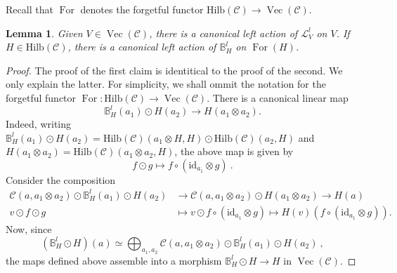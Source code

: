 \documentclass[a4paper,11pt,reqno]{amsart}
\numberwithin{equation}{section}
\newtheorem{lemma}[theorem]{Lemma}
\theoremstyle{remark}
\theoremstyle{definition}
\newcommand{\bB}{\mathbb B}
\newcommand{\cC}{\mathcal C}
\newcommand{\cL}{\mathcal L}
\DeclareMathOperator{\Vect}{Vec}
\DeclareMathOperator{\For}{For}
\newcommand{\id}{\mathrm{id}}
\newcommand{\Hilb}{\mathrm{Hilb}}
\begin{document}
Recall that $\For$ denotes the forgetful functor $\Hilb(\cC) \to \Vect(\cC)$.

\begin{lemma}
    Given $V \in \Vect(\cC)$, there is a canonical left action of $\cL_V^l$ on $V$. If $H \in \Hilb(\cC)$, there is a canonical left action of $\bB^l_H$ on $\For(H)$.
    \label{lemma:canonicalactionrightboundedoperators}
\end{lemma}
\begin{proof}
The proof of the first claim is identitical to the proof of the second. We only explain the latter. For simplicity, we shall ommit the notation for the forgetful functor $\For: \Hilb(\cC) \to \Vect(\cC)$. There is a canonical linear map
\[ \bB^l_H(a_1) \odot H(a_2) \to H(a_1 \otimes a_2) . \]
Indeed, writing $\bB^l_H(a_1) \odot H(a_2) = \Hilb(\cC)(a_1 \otimes H,H) \odot \Hilb(\cC)(a_2,H)$ and $H(a_1 \otimes a_2) = \Hilb(\cC)(a_1 \otimes a_2, H)$, the above map is given by
    \[ f \odot g \mapsto f \circ (\id_{a_1} \otimes g) \ . \]
    Consider the composition
    \begin{align*}
    \cC(a, a_1 \otimes a_2) \odot \bB^l_H(a_1) \odot H(a_2) &\to \cC(a,a_1 \otimes a_2) \odot H(a_1 \otimes a_2)\to H(a) \\
    v \odot f \odot g &\mapsto v \odot f \circ (\id_{a_1} \otimes g)  \mapsto H(v) \left( f \circ (\id_{a_1} \otimes g) \right). 
    \end{align*}
    Now, since
    \[ (\bB^l_H \odot H) (a) \simeq \bigoplus_{a_1,a_2} \cC(a,a_1 \otimes a_2) \odot \bB^l_H(a_1) \odot H(a_2) \ , \]
    the maps defined above assemble into a morphism $\bB^l_H \odot H \to H$ in $\Vect(\cC)$.


\end{proof}
\end{document}

